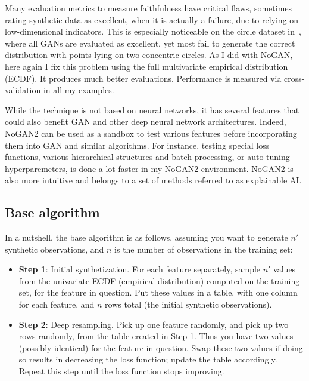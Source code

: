 \documentclass[oneside,10pt]{book}
\begin{document}
Many evaluation metrics to measure faithfulness have critical flaws, sometimes rating synthetic data as excellent, when it is actually a failure, due to relying on low-dimensional indicators. 
This is especially noticeable on the circle dataset in~\cite{vgvendors}, where all GANs are evaluated as excellent, yet most
 fail to generate the correct distribution with points lying on two concentric circles.   As I did with NoGAN, here again I fix this problem using the full \textcolor{index}{multivariate empirical distribution} (ECDF).  It produces much better evaluations. Performance is measured via  \textcolor{index}{cross-validation} in all my examples. 

While the technique is not based on neural networks, it has several features that could also benefit GAN and other deep neural network architectures. 
 Indeed, NoGAN2 can be used as a sandbox to test various features before incorporating them into GAN and similar algorithms. For instance, testing 
 special loss functions, various hierarchical structures and batch processing, or auto-tuning hyperparemeters, is done a lot faster in my NoGAN2
 environment. NoGAN2 is also more intuitive and belongs to a set of methods referred to as \textcolor{index}{explainable AI}.

\subsection{Base algorithm}\label{poireswds}

In a nutshell, the base algorithm is as follows, assuming you want to generate $n'$ synthetic observations, and $n$ is the number of observations in the training set:\vspace{1ex}

\begin{itemize}
\item[]{\bf Step 1}: Initial synthetization. For each feature separately, sample $n'$ values from the univariate \textcolor{index}{ECDF} (empirical distribution) computed on the training set, for the feature in question.
Put these values in a table, with one column for each feature, and $n$ rows total (the initial synthetic observations).
\vspace{1ex}
\item[]{\bf Step 2}: Deep resampling. Pick up one feature randomly, and pick up two rows randomly, from the table created in Step 1. Thus you have
 two values (possibly identical) for the feature in question. Swap these two values if doing so results in decreasing the 
\textcolor{index}{loss function};  update the table accordingly. Repeat this step 
 until the loss function stops improving.
\end{itemize}\vspace{1ex}
\end{document}
